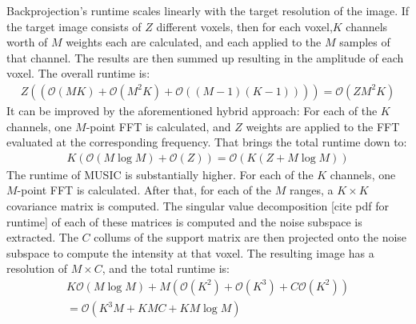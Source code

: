 Backprojection's runtime scales linearly with the target resolution of the image.
If the target image consists of $Z$ different voxels,
then for each voxel,$K$ channels worth of $M$ weights each are calculated, and each applied to the $M$ samples of that channel.
The results are then summed up resulting in the amplitude of each voxel.
The overall runtime is:
\begin{align}
    Z \left(\left(\mathcal O(MK) + \mathcal O(M^2K) + \mathcal O((M-1)(K-1))\right)\right) = \mathcal O(ZM^2K)
\end{align}
It can be improved by the aforementioned hybrid approach:
For each of the $K$ channels, one $M$-point FFT is calculated,
and $Z$ weights are applied to the FFT evaluated at the corresponding frequency.
That brings the total runtime down to:
\begin{align}
    K \left( \mathcal O(M \log M) + \mathcal O(Z)\right) = \mathcal O \left(K(Z + M\log M) \right)
\end{align}
The runtime of MUSIC is substantially higher.
For each of the $K$ channels, one $M$-point FFT is calculated.
After that, for each of the $M$ ranges, a $K\times K$ covariance matrix is computed.
The singular value decomposition [cite pdf for runtime] of each of these matrices is computed and the noise subspace is extracted.
The $C$ collums of the support matrix are then projected onto the noise subspace to compute the intensity at that voxel.
The resulting image has a resolution of $M\times C$, and the total runtime is:
\begin{align}
    K \mathcal O ( M \log M) + M ( \mathcal O (K^2) + \mathcal O (K^3) + C \mathcal O(K^2)) \\
    = \mathcal O \left(K^3M +KMC+KM\log M\right)
\end{align}